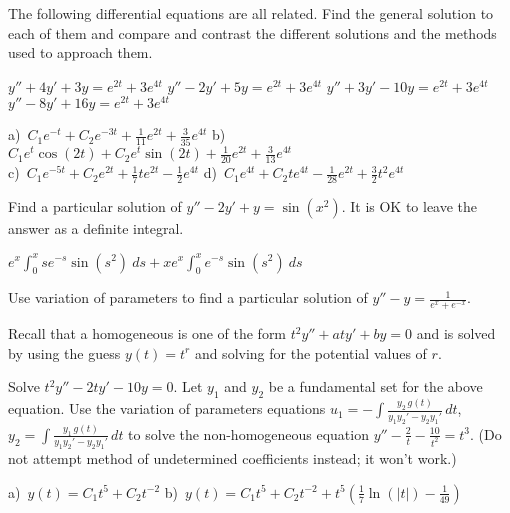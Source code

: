 \begin{exercise}
The following differential equations are all related. Find the general solution to each of them and compare and contrast the different solutions and the methods used to approach them.
\begin{tasks}
\task $y'' + 4y' + 3y = e^{2t} + 3e^{4t}$ 
\task $y'' - 2y' + 5y = e^{2t} + 3e^{4t}$
\task $y'' + 3y' - 10y = e^{2t} + 3e^{4t}$
\task $y'' - 8y'  + 16y = e^{2t} + 3e^{4t}$
\end{tasks}
\end{exercise}
\comboSol{%
}
{%
a)~$C_1e^{-t} + C_2e^{-3t} + \frac{1}{11}e^{2t} + \frac{3}{35}e^{4t}$ \quad b)~$C_1e^{t}\cos(2t) + C_2e^t\sin(2t) + \frac{1}{20}e^{2t} + \frac{3}{13}e^{4t}$ \\ c)~$C_1e^{-5t} + C_2e^{2t} + \frac{1}{7}te^{2t} - \frac{1}{2}e^{4t}$ \quad d)~$C_1e^{4t} + C_2te^{4t} - \frac{1}{28}e^{2t} + \frac{3}{2}t^2e^{4t}$
}

\begin{exercise}
Find a particular solution of
$y''-2y' +y = \sin (x^2)$.  It is OK to leave the answer as a definite
integral.
\end{exercise}
\comboSol{%
}
{%
$e^x\int_0^x se^{-s}\sin(s^2)\ ds + xe^x\int_0^xe^{-s}\sin(s^2)\ ds$
}

\begin{exercise}
Use variation of parameters to
find a particular solution of $y''-y = \frac{1}{e^x+e^{-x}}$.
\end{exercise}

\begin{exercise}
Recall that a homogeneous \emph{} is one of the form $t^2y'' + aty' + by = 0$ and is solved by using the guess $y(t) = t^r$ and solving for the potential values of $r$. 
\begin{tasks}
\task Solve $t^2y''-2ty'-10y=0$. %
\task Let $y_1$ and $y_2$ be a fundamental set for the above equation. Use the variation of parameters equations $\displaystyle u_1=-\int \frac{y_2\, g(t)}{y_1y_2' - y_2y_1'}\,dt$, $\displaystyle y_2=\int \frac{y_1\, g(t)}{y_1y_2' - y_2y_1'}\,dt$ to solve the non-homogeneous equation $\displaystyle y''-\frac{2}{t} - \frac{10}{t^2}=t^3$. \hfill\break (Do not attempt method of undetermined coefficients instead; it won't work.)
\end{tasks}
\end{exercise}
\comboSol{%
}
{%
a)~$y(t) = C_1t^5 + C_2t^{-2}$ \quad
b)~$y(t) = C_1t^5 + C_2t^{-2} + t^5\left(\frac{1}{7}\ln(|t|) - \frac{1}{49}\right)$
}

